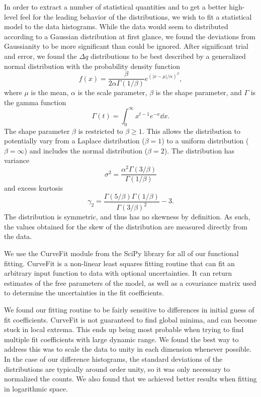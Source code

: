In order to extract a number of statistical quantities and to get a better high-level feel for the leading behavior of the distributions, we wish to fit a statistical model to the data histograms.  While the data would seem to distributed according to a Gaussian distribution at first glance, we found the deviations from Gaussianity to be more significant than could be ignored.  After significant trial and error, we found the $\Delta q$ distributions to be best described by a generalized normal distribution \citep{doi:10.1080/02664760500079464} with the probability density function
\begin{equation} \label{eq:analysis--generalized_normal}
	f(x) = \frac{ \beta }{2 \alpha \Gamma(1 / \beta)} e^{\left( \left| x - \mu \right| / \alpha \right)^{\beta}},
\end{equation}
where $\mu$ is the mean, $\alpha$ is the scale parameter, $\beta$ is the shape parameter, and $\Gamma$ is the gamma function
\begin{equation} \label{eq:analysis--gamma_function}
	\Gamma(t) = \int_{0}^{\infty} x^{t-1} e^{-x} \dd x.
\end{equation}
The shape parameter $\beta$ is restricted to $\beta \geq 1$.  This allows the distribution to potentially vary from a Laplace distribution ($\beta = 1$) to a uniform distribution ($\beta = \infty$) and includes the normal distribution ($\beta = 2$).  The distribution has variance
\begin{equation} \label{eq:analysis--variance}
	\sigma^{2} = \frac{ \alpha^{2} \Gamma(3/\beta) }{ \Gamma(1/\beta) }
\end{equation}
and excess kurtosis
\begin{equation} \label{eq:analysis--kurtosis}
	\gamma_{2} = \frac{ \Gamma(5/\beta) \Gamma(1/\beta) }{ \Gamma(3/\beta)^{2} } - 3.
\end{equation}
The distribution is symmetric, and thus has no skewness by definition.  As such, the values obtained for the skew of the distribution are measured directly from the data.

We use the CurveFit module from the SciPy library for all of our functional fitting.  CurveFit is a non-linear least squares fitting routine that can fit an arbitrary input function to data with optional uncertainties.  It can return estimates of the free parameters of the model, as well as a covariance matrix used to determine the uncertainties in the fit coefficients.

We found our fitting routine to be fairly sensitive to differences in initial guess of fit coefficients.  CurveFit is not guaranteed to find global minima, and can become stuck in local extrema.  This ends up being most probable when trying to find multiple fit coefficients with large dynamic range.  We found the best way to address this was to scale the data to unity in each dimension whenever possible.  In the case of our difference histograms, the standard deviations of the distributions are typically around order unity, so it was only necessary to normalized the counts.  We also found that we achieved better results when fitting in logarithmic space.

